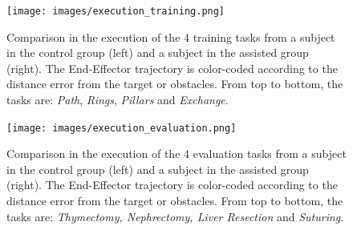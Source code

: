 \documentclass[../main.tex]{subfiles}
\begin{document}
\begin{figure}
    \centering
    \texttt{[image: images/execution\_training.png]}
    \caption{Comparison in the execution of the 4 training tasks from a subject in the control group (left) and a subject in the assisted group (right). The End-Effector trajectory is color-coded according to the distance error from the target or obstacles. From top to bottom, the tasks are: \textit{Path}, \textit{Rings}, \textit{Pillars} and \textit{Exchange}.}
    \label{fig:executiontraining}
\end{figure}
\begin{figure}
    \centering
    \texttt{[image: images/execution\_evaluation.png]}
    \caption{Comparison in the execution of the 4 evaluation tasks from a subject in the control group (left) and a subject in the assisted group (right). The End-Effector trajectory is color-coded according to the distance error from the target or obstacles. From top to bottom, the tasks are: \textit{Thymectomy, Nephrectomy, Liver Resection} and \textit{Suturing}.}
    \label{fig:executionevaluation}
\end{figure}

% 
% 
\end{document}
